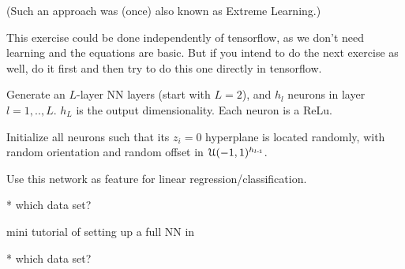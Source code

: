 (Such an approach was (once) also known as Extreme Learning.)

This exercise could be done independently of tensorflow, as we don't
need learning and the equations are basic. But if you intend to do the
next exercise as well, do it first and then try to do this one
directly in tensorflow.

Generate an $L$-layer NN layers (start with $L=2$), and $h_l$ neurons in layer $l=1,..,L$. $h_L$ is the output dimensionality. Each neuron is a ReLu.

Initialize all neurons such that its $z_i=0$ hyperplane is located randomly, with random orientation and random offset in ${\cal U}(-1,1)^{h_{l{{\hspace*{-.0pt}\text{\rm -}\hspace*{-.5pt}}1}}}$.

Use this network as feature for linear regression/classification.

* which data set?



mini tutorial of setting up a full NN in 

* which data set?


\exerfoot
